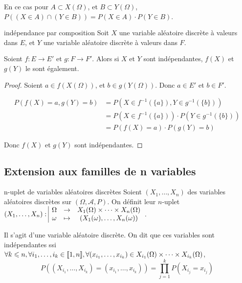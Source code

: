 \begin{corollaire}{}{}
    En ce cas pour $A \subset X(\Omega)$, et $B \subset Y(\Omega)$,
    $P((X \in A) \cap (Y \in B)) = P(X \in A) \cdot P(Y \in B)$.
\end{corollaire}

\begin{proposition}{indépendance par composition}{}
    Soit $X$ une variable aléatoire discrète à valeurs dans $E$, et 
    $Y$ une variable aléatoire discrète à valeurs dans $F$. 

    Soient $f : E \to E'$ et $g : F \to F'$. Alors si $X$ et $Y$ sont indépendantes,
    $f(X)$ et $g(Y)$ le sont également.
\end{proposition}

\begin{proof}
    Soient $a \in f(X(\Omega))$, et $b \in g(Y(\Omega))$. Donc $a \in E'$ et $b \in F'$.

    \begin{align}
        P(f(X) = a, g(Y) = b) & = P(X \in f^{-1}(\{a\}), Y \in g^{-1}(\{b\})) \\
        & = P(X \in f^{-1}(\{a\})) \cdot P(Y \in g^{-1}(\{b\})) \\
        & = P(f(X) = a) \cdot P(g(Y) = b)
    \end{align}

    Donc $f(X)$ et $g(Y)$ sont indépendantes.
\end{proof}

\subsection{Extension aux familles de n variables }

\begin{proposition}{n-uplet de variables aléatoires discrètes}{}
    Soient $(X_1, \dots, X_n)$ des variables aléatoires discrètes sur 
    $(\Omega, \mathcal A, P)$. On définit leur $n$-uplet 
    $(X_1, \dots, X_n): \space \begin{array}{|ccc} \displaystyle \Omega & \to & \displaystyle X_1(\Omega) \times \cdots \times X_n(\Omega) \\ \displaystyle \omega & \mapsto & \displaystyle (X_1(\omega), \dots, X_n(\omega)) \end{array}$.

    Il s'agit d'une variable aléatoire discrète. On dit que ces variables sont indépendantes 
    ssi $\forall k \leqslant n, \forall i_1, \dots, i_k \in [\![1, n]\!], \forall (x_{i_1}, \dots, x_{i_k}) \in X_{i_1}(\Omega) \times \cdots \times X_{i_k}(\Omega)$,
    $$ P((X_{i_1}, \dots, X_{i_k}) = (x_{i_1}, \dots, x_{i_k})) = \prod_{j = 1}^k P(X_{i_j} = x_{i_j})$$
\end{proposition}

